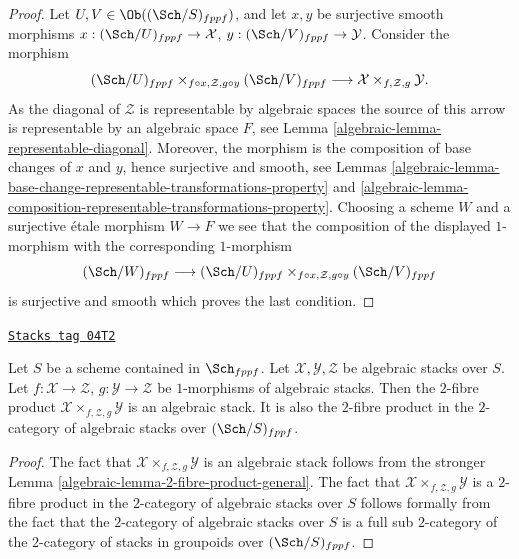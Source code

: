 \begin{proof}
\medskip\noindent
Let $U, V \in \Ob((\Sch/S)_{fppf})$,
and let $x, y$ be surjective smooth morphisms
$x : (\Sch/U)_{fppf} \to \mathcal{X}$,
$y : (\Sch/V)_{fppf} \to \mathcal{Y}$.
Consider the morphism
$$
(\Sch/U)_{fppf}
\times_{f \circ x, \mathcal{Z}, g \circ y}
(\Sch/V)_{fppf}
\longrightarrow
\mathcal{X} \times_{f, \mathcal{Z}, g} \mathcal{Y}.
$$
As the diagonal of $\mathcal{Z}$ is representable by algebraic spaces
the source of this arrow is representable by an algebraic space $F$, see
Lemma \ref{algebraic-lemma-representable-diagonal}.
Moreover, the morphism is the composition
of base changes of $x$ and $y$, hence surjective and smooth, see
Lemmas \ref{algebraic-lemma-base-change-representable-transformations-property} and
\ref{algebraic-lemma-composition-representable-transformations-property}.
Choosing a scheme $W$ and a surjective \'etale morphism $W \to F$
we see that the composition of the displayed $1$-morphism
with the corresponding $1$-morphism
$$
(\Sch/W)_{fppf}
\longrightarrow
(\Sch/U)_{fppf}
\times_{f \circ x, \mathcal{Z}, g \circ y}
(\Sch/V)_{fppf}
$$
is surjective and smooth which proves the last condition.
\end{proof}

\begin{lemma}
\label{algebraic-lemma-2-fibre-product}
\href{https://stacks.math.columbia.edu/tag/04T2}{\texttt{Stacks tag 04T2}}

Let $S$ be a scheme contained in $\Sch_{fppf}$.
Let $\mathcal{X}, \mathcal{Y}, \mathcal{Z}$ be algebraic stacks over $S$.
Let $f : \mathcal{X} \to \mathcal{Z}$, $g : \mathcal{Y} \to \mathcal{Z}$
be $1$-morphisms of algebraic stacks. Then the $2$-fibre product
$\mathcal{X} \times_{f, \mathcal{Z}, g} \mathcal{Y}$ is an algebraic stack.
It is also the $2$-fibre product in the $2$-category of algebraic stacks
over $(\Sch/S)_{fppf}$.
\end{lemma}

\begin{proof}

The fact that $\mathcal{X} \times_{f, \mathcal{Z}, g} \mathcal{Y}$ is an
algebraic stack follows from the stronger
Lemma \ref{algebraic-lemma-2-fibre-product-general}.
The fact that $\mathcal{X} \times_{f, \mathcal{Z}, g} \mathcal{Y}$
is a $2$-fibre product in the $2$-category of algebraic stacks over $S$
follows formally from the fact that the $2$-category of algebraic stacks
over $S$ is a full sub $2$-category of the $2$-category of stacks in
groupoids over $(\Sch/S)_{fppf}$.
\end{proof}

